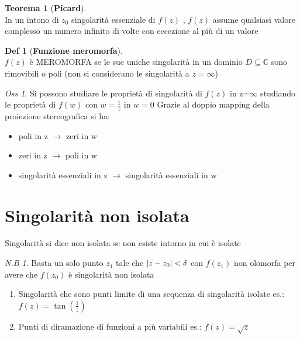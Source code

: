 \documentclass[a4paper,11pt]{report}
\theoremstyle{remark}
\newtheorem*{oss}{Oss}
\newtheorem*{nb}{N.B}
\theoremstyle{definition}
\newtheorem*{teo}{Teorema}
\newtheorem*{Def}{Def}
\newcommand{\C}{\mathbb{C}}
\DeclarePairedDelimiter{\abs}{\lvert}{\rvert}
\begin{document}
\begin{teo}[\textbf{Picard}]\hfil\\
	In un intono di $z_0$ singolarità essenziale di $f(z)$ , $f(z)$ assume qualsiasi valore complesso un numero infinito di volte con eccezione al più di un valore
\end{teo}
\begin{Def}[\textbf{Funzione meromorfa}]\hfil\\
	$f(z)$ è MEROMORFA se le sue uniche singolarità in un dominio $D \subseteq \C$ sono rimovibili o poli (non si considerano le singolarità a $z=\infty$)
\end{Def}
	\begin{oss}
		Si possono studiare le proprietà di singolarità di $f(z)$ in z=$\infty$ studiando le proprietà di $f(w)$ con $w=\frac{1}{z}$ in $w=0$ \newline
		Grazie al doppio mapping della proiezione stereografica si ha: 
	\end{oss}
	\begin{itemize}
		\item poli in z $\rightarrow$ zeri in w 
		\item zeri in z $\rightarrow$ poli in w
		\item singolarità essenziali in z $\rightarrow$ singolarità essenziali in w
	\end{itemize} 
	\section*{Singolarità non isolata}
	Singolarità si dice non isolata se non esiste intorno in cui è isolate
	\begin{nb}
		Basta un solo punto $z_1$ tale che $\abs{z-z_0}<\delta$ con $f(z_1)$ non olomorfa per avere che $f(z_0)$ è singolarità non isolata
	\end{nb}
	\begin{enumerate}
		\item Singolarità che sono punti limite di una sequenza di singolarità isolate \newline
		es.: $f(z) = \tan(\frac{1}{z})$
		\item Punti di diramazione di funzioni a più variabili \newline
		es.: $f(z) = \sqrt{z}$
	\end{enumerate}
\end{document}
